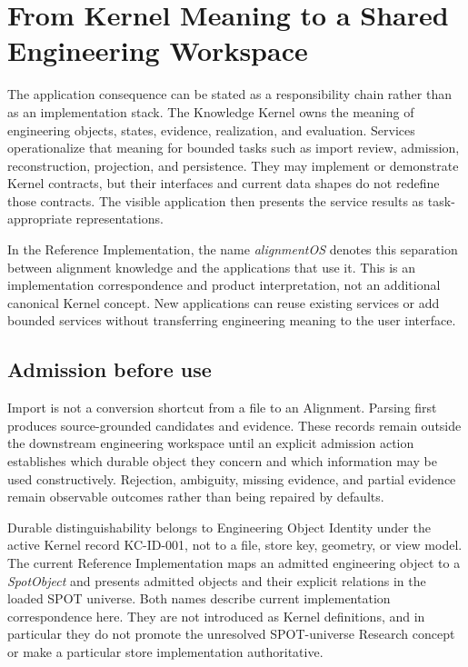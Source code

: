 \section{From Kernel Meaning to a Shared Engineering Workspace}

The application consequence can be stated as a responsibility chain rather
than as an implementation stack. The Knowledge Kernel owns the meaning of
engineering objects, states, evidence, realization, and evaluation. Services
operationalize that meaning for bounded tasks such as import review,
admission, reconstruction, projection, and persistence. They may implement
or demonstrate Kernel contracts, but their interfaces and current data shapes
do not redefine those contracts. The visible application then presents the
service results as task-appropriate representations.

In the Reference Implementation, the name \emph{alignmentOS} denotes this
separation between alignment knowledge and the applications that use it. This
is an implementation correspondence and product interpretation, not an
additional canonical Kernel concept. New applications can reuse existing
services or add bounded services without transferring engineering meaning to
the user interface.

\subsection{Admission before use}

Import is not a conversion shortcut from a file to an Alignment. Parsing first
produces source-grounded candidates and evidence. These records remain outside
the downstream engineering workspace until an explicit admission action
establishes which durable object they concern and which information may be used
constructively. Rejection, ambiguity, missing evidence, and partial evidence
remain observable outcomes rather than being repaired by defaults.

Durable distinguishability belongs to Engineering Object Identity under the
active Kernel record KC-ID-001, not to a file, store key, geometry, or view
model. The current Reference Implementation maps an admitted engineering
object to a \emph{SpotObject} and presents admitted objects and their explicit
relations in the loaded SPOT universe. Both names describe current
implementation correspondence here. They are not introduced as Kernel
definitions, and in particular they do not promote the unresolved SPOT-universe
Research concept or make a particular store implementation authoritative.

